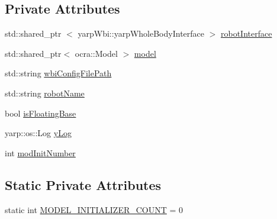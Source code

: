 \subsection*{\-Private \-Attributes}
\begin{DoxyCompactItemize}
\item 
std\-::shared\-\_\-ptr\*
$<$ yarp\-Wbi\-::yarp\-Whole\-Body\-Interface $>$ \hyperlink{classocra__icub_1_1ModelInitializer_a86b4917ca6ebc3ec9239a4c417cb6b2a}{robot\-Interface}
\item 
std\-::shared\-\_\-ptr$<$ ocra\-::\-Model $>$ \hyperlink{classocra__icub_1_1ModelInitializer_ab7fb1fe2773837be8b3b41b75ef8f9d6}{model}
\item 
std\-::string \hyperlink{classocra__icub_1_1ModelInitializer_add617233dd3940f79f03cb6a2ed6adb5}{wbi\-Config\-File\-Path}
\item 
std\-::string \hyperlink{classocra__icub_1_1ModelInitializer_aef3121c44b93b22cf24c4ccbbc477128}{robot\-Name}
\item 
bool \hyperlink{classocra__icub_1_1ModelInitializer_a51d73f808c75fbc1284f460e7ff66d6a}{is\-Floating\-Base}
\item 
yarp\-::os\-::\-Log \hyperlink{classocra__icub_1_1ModelInitializer_a7ecf8156a05245831e51cc212eec5985}{y\-Log}
\item 
int \hyperlink{classocra__icub_1_1ModelInitializer_ab63cc70107cab38cc01a87d7a5465d85}{mod\-Init\-Number}
\end{DoxyCompactItemize}
\subsection*{\-Static \-Private \-Attributes}
\begin{DoxyCompactItemize}
\item 
static int \hyperlink{classocra__icub_1_1ModelInitializer_a8ec0a5af61b4a972ea22b71a5d3511eb}{\-M\-O\-D\-E\-L\-\_\-\-I\-N\-I\-T\-I\-A\-L\-I\-Z\-E\-R\-\_\-\-C\-O\-U\-N\-T} = 0
\end{DoxyCompactItemize}



